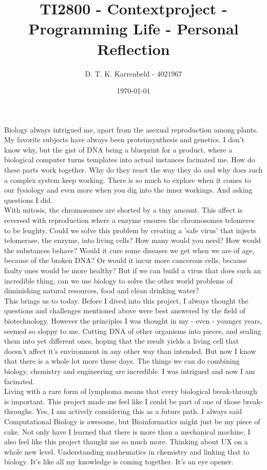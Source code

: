 \documentclass{article}
\title{TI2800 - Contextproject - Programming Life - Personal Reflection}
\author{D. T. K. Karrenbeld - 4021967}
\date{\today}
\begin{document}
	\maketitle
Biology always intrigued me, apart from the asexual reproduction among plants. My favorite subjects have always been proteinsynthesis and genetics. I don't know why, but the gist of DNA being a blueprint for a product, where a biological computer turns templates into actual instances facinated me. How do these parts work together. Why do they react the way they do and why does such a complex system keep working. There is so much to explore when it comes to our fysiology and even more when you dig into the inner workings. And asking questions I did.\\

With mitosis, the chromosomes are shorted by a tiny amount. This affect is reversed with reproduction where a enzyme ensures the chromosomes telomeres to be lenghty. Could we solve this problem by creating a 'safe virus' that injects telomerase, the enzyme, into living cells? How many would you need? How would the substances behave? Would it cure some diseases we get when we are of age, because of the broken DNA? Or would it incur more cancerous cells, because faulty ones would be more healthy? But if we can build a virus that does such an incredible thing, can we use biology to solve the other world problems of diminishing natural resources, food and clean drinking water? \\

This brings us to today. Before I dived into this project, I always thought the questions and challenges mentioned above were best answered by the field of biotechnology. However the principles I was thought in my - even - younger years, seemed so sloppy to me. Cutting DNA of other organisms into pieces, and sealing them into yet different ones, hoping that the result yields a living cell that doesn't affect it's environment in any other way than intended. But now I know that there is a whole lot more these days. The things we can do combining biology, chemistry and engineering are incredible. I was intrigued and now I am facinated. \\

Living with a rare form of lymphoma means that every biological break-through is important. This project made me feel like I could be part of one of those break-throughs. Yes, I am actively considering this as a future path. I always said Computational Biology is awesome, but Bioinformatics might just be my piece of cake. Not only have I learned that there is more than a mechanical machine, I also feel like this project thaught me so much more. Thinking about UX on a whole new level. Understanding mathematics in chemistry and linking that to biology. It's like all my knowledge is coming together. It's an eye opener.\\
\end{document}
